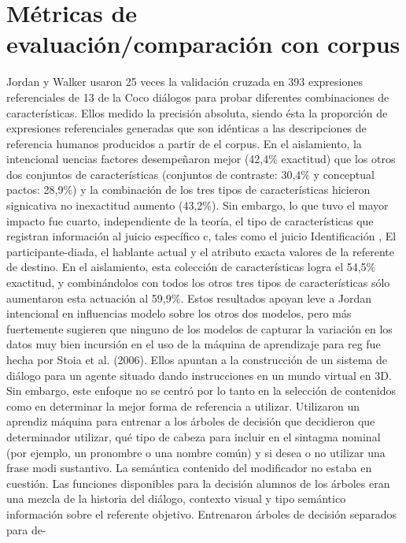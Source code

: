 \section{M\'etricas de evaluaci\'on/comparaci\'on con corpus}
\label{sec:metricas_evaluacion}
Jordan y Walker usaron 25 veces la validaci\'on cruzada en 393 expresiones referenciales
de 13 de la Coco di\'alogos para probar diferentes combinaciones de caracter\'isticas. Ellos
medido la precisi\'on absoluta, siendo \'esta la proporci\'on de expresiones referenciales
generadas que son id\'enticas a las descripciones de referencia humanos producidos a partir de
el corpus. En el aislamiento, la intencional uencias factores desempe\~naron mejor (42,4\%
exactitud) que los otros dos conjuntos de caracter\'isticas (conjuntos de contraste: 30,4\% y conceptual
pactos: 28,9\%) y la combinaci\'on de los tres tipos de caracter\'isticas hicieron signicativa no inexactitud aumento (43,2\%). Sin embargo, lo que tuvo el mayor impacto fue cuarto,
independiente de la teor\'ia, el tipo de caracter\'isticas que registran informaci\'on al juicio espec\'ifico c, tales
como el juicio
Identificaci\'on
, El participante-diada, el hablante actual y el atributo exacta
valores de la referente de destino. En el aislamiento, esta colecci\'on de caracter\'isticas logra el 54,5\%
exactitud, y combin\'andolos con todos los otros tres tipos de caracter\'isticas s\'olo aumentaron
esta actuaci\'on al 59,9\%. Estos resultados apoyan leve a Jordan intencional
en
influencias modelo sobre los otros dos modelos, pero m\'as fuertemente sugieren que ninguno
de los modelos de capturar la variaci\'on en los datos muy bien
incursi\'on en el uso de la m\'aquina de aprendizaje para
reg
fue hecha por Stoia et al.
(2006). Ellos apuntan a la construcci\'on de un sistema de di\'alogo para un agente situado dando
instrucciones en un mundo virtual en 3D. Sin embargo, este enfoque no se centr\'o por lo
tanto en la selecci\'on de contenidos como en determinar la mejor forma de referencia a utilizar.
Utilizaron un aprendiz m\'aquina para entrenar a los \'arboles de decisi\'on que decidieron que determinador
utilizar, qu\'e tipo de cabeza para incluir en el sintagma nominal (por ejemplo, un pronombre o una
nombre com\'un) y si desea o no utilizar una frase modi sustantivo. La sem\'antica
contenido del modificador no estaba en cuesti\'on. Las funciones disponibles para la decisi\'on
alumnos de los \'arboles eran una mezcla de la historia del di\'alogo, contexto visual y tipo sem\'antico
informaci\'on sobre el referente objetivo. Entrenaron \'arboles de decisi\'on separados para de-
